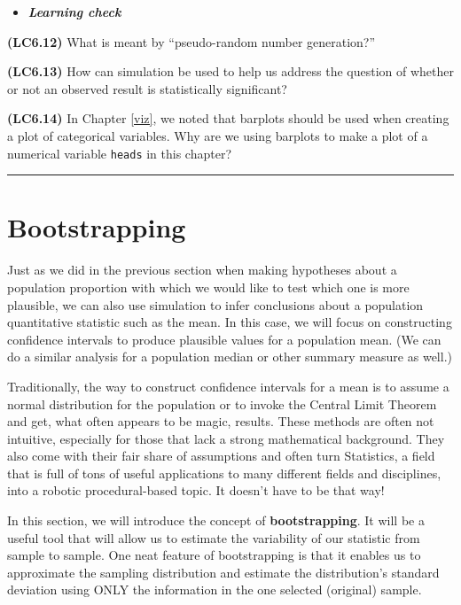 \documentclass[]{tufte-book}
\let\oldrule=\rule
\renewcommand{\rule}[1]{\oldrule{\linewidth}}
\newenvironment{rmdblock}[1]
  {\begin{shaded*}
  \begin{itemize}
  \renewcommand{\labelitemi}{
    \raisebox{-.7\height}[0pt][0pt]{
    }
  }
  \item
  }
  {
  \end{itemize}
  \end{shaded*}
  }
\newenvironment{learncheck}
  {\begin{rmdblock}{warning}}
  {\end{rmdblock}}
\begin{document}
\begin{learncheck}
\textbf{\emph{Learning check}}
\end{learncheck}

\textbf{(LC6.12)} What is meant by ``pseudo-random number generation?''

\textbf{(LC6.13)} How can simulation be used to help us address the
question of whether or not an observed result is statistically
significant?

\textbf{(LC6.14)} In Chapter \ref{viz}, we noted that barplots should be
used when creating a plot of categorical variables. Why are we using
barplots to make a plot of a numerical variable \texttt{heads} in this
chapter?

\begin{center}\rule{0.5\linewidth}{\linethickness}\end{center}

\section{Bootstrapping}\label{bootstrapping}

Just as we did in the previous section when making hypotheses about a
population proportion with which we would like to test which one is more
plausible, we can also use simulation to infer conclusions about a
population quantitative statistic such as the mean. In this case, we
will focus on constructing confidence intervals to produce plausible
values for a population mean. (We can do a similar analysis for a
population median or other summary measure as well.)

Traditionally, the way to construct confidence intervals for a mean is
to assume a normal distribution for the population or to invoke the
Central Limit Theorem and get, what often appears to be magic, results.
These methods are often not intuitive, especially for those that lack a
strong mathematical background. They also come with their fair share of
assumptions and often turn Statistics, a field that is full of tons of
useful applications to many different fields and disciplines, into a
robotic procedural-based topic. It doesn't have to be that way!

In this section, we will introduce the concept of
\textbf{bootstrapping}. It will be a useful tool that will allow us to
estimate the variability of our statistic from sample to sample. One
neat feature of bootstrapping is that it enables us to approximate the
sampling distribution and estimate the distribution's standard deviation
using ONLY the information in the one selected (original) sample.
\end{document}
